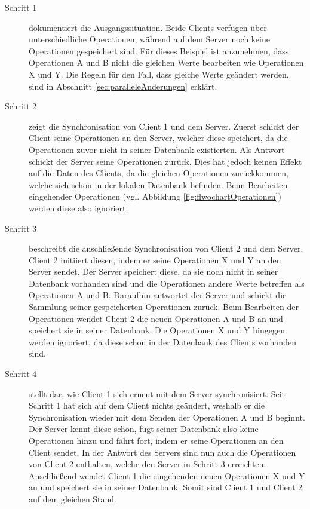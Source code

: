 \documentclass[a4paper, 12pt]{scrreprt}
\begin{document}
\begin{description}
	\item[Schritt 1] dokumentiert die Ausgangssituation. Beide Clients verfügen über unterschiedliche Operationen, während auf dem Server noch keine Operationen gespeichert sind. Für dieses Beispiel ist anzunehmen, dass Operationen A und B nicht die gleichen Werte bearbeiten wie Operationen X und Y. Die Regeln für den Fall, dass gleiche Werte geändert werden, sind in Abschnitt \ref{sec:paralleleÄnderungen} erklärt.
	\item[Schritt 2] zeigt die Synchronisation von Client 1 und dem Server. Zuerst schickt der Client seine Operationen an den Server, welcher diese speichert, da die Operationen zuvor nicht in seiner Datenbank existierten. Als Antwort schickt der Server seine Operationen zurück. Dies hat jedoch keinen Effekt auf die Daten des Clients, da die gleichen Operationen zurückkommen, welche sich schon in der lokalen Datenbank befinden. Beim Bearbeiten eingehender Operationen (vgl. Abbildung \ref{fig:flwochartOperationen}) werden diese also ignoriert.
	\item[Schritt 3] beschreibt die anschließende Synchronisation von Client 2 und dem Server. Client 2 initiiert diesen, indem er seine Operationen X und Y an den Server sendet. Der Server speichert diese, da sie noch nicht in seiner Datenbank vorhanden sind und die Operationen andere Werte betreffen als Operationen A und B. Daraufhin antwortet der Server und schickt die Sammlung seiner gespeicherten Operationen zurück. Beim Bearbeiten der Operationen wendet Client 2 die neuen Operationen A und B an und speichert sie in seiner Datenbank. Die Operationen X und Y hingegen werden ignoriert, da diese schon in der Datenbank des Clients vorhanden sind.
	\item[Schritt 4] stellt dar, wie Client 1 sich erneut mit dem Server synchronisiert. Seit Schritt 1 hat sich auf dem Client nichts geändert, weshalb er die Synchronisation wieder mit dem Senden der Operationen A und B beginnt. Der Server kennt diese schon, fügt seiner Datenbank also keine Operationen hinzu und fährt fort, indem er seine Operationen an den Client sendet. In der Antwort des Servers sind nun auch die Operationen von Client 2 enthalten, welche den Server in Schritt 3 erreichten. Anschließend wendet Client 1 die eingehenden neuen Operationen X und Y an und speichert sie in seiner Datenbank. Somit sind Client 1 und Client 2 auf dem gleichen Stand. 
\end{description} 
\end{document}

